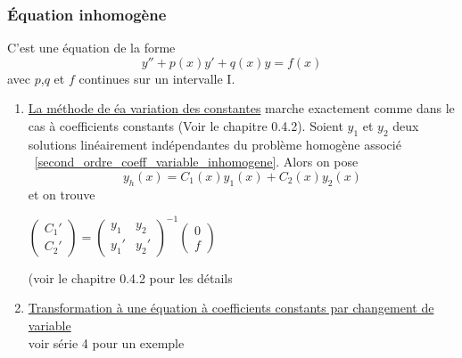 \documentclass[12pt,a4paper]{article}
\begin{document}
\subsubsection{Équation inhomogène}
C'est une équation de la forme 
\begin{equation}
	y'' + p(x)y' + q(x)y = f(x)
	\label{second_ordre_coeff_variable_inhomogene}
\end{equation}
avec $p$,$q$ et $f$ continues sur un intervalle I.
\begin{enumerate}[label=\roman*)]
	\item \underline{La méthode de éa variation des constantes} marche exactement comme dans le cas à coefficients constants (Voir le chapitre 0.4.2). Soient $y_1$ et $y_2$ deux solutions linéairement indépendantes du problème homogène associé ~\eqref{second_ordre_coeff_variable_inhomogene}. Alors on pose
	\begin{equation*}
		y_h(x) = C_1(x)y_1(x) + C_2(x)y_2(x)
	\end{equation*}
	et on trouve
	\begin{boite}[0.4]
	$\begin{pmatrix}
		C_1'\\
		C_2'
	\end{pmatrix}
	=
	\begin{pmatrix}
		y_1 & y_2\\
		y_1' & y_2'
	\end{pmatrix}^{-1}
	\begin{pmatrix}
	0\\
	f
	\end{pmatrix}$
	\end{boite}
	(voir le chapitre 0.4.2 pour les détails
	\item \underline{Transformation à une équation à coefficients constants par changement de variable}\\
	voir série 4 pour un exemple
\end{enumerate}
\end{document}
